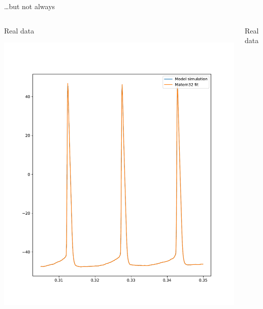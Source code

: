 \documentclass[presentation]{beamer}
\begin{document}
\begin{frame}[plain,label={sec:orgc853557}]{\ldots{}but not always}
\begin{columns}
\begin{column}{0.5\columnwidth}
\begin{center}
Real data
\end{center}

\begin{center}
\includegraphics[width=1.1\textwidth]{./Matern5.pdf}
\end{center}
\end{column}

\begin{column}{0.5\columnwidth}
\begin{center}
Real data
\end{center}


\end{column}
\end{columns}
\end{frame}
\end{document}

